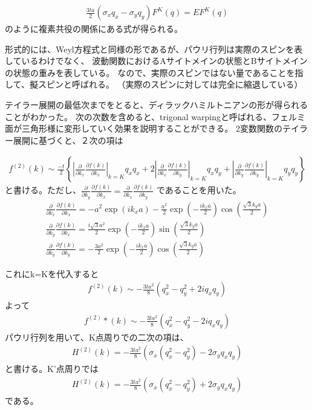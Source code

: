 \documentclass{article}
\begin{document}
\begin{eqnarray}
\frac{3ta}{2} \left( 
\sigma_x q_x-\sigma_y q_y
\right)F^K(q)=E F^K(q)
\end{eqnarray}
のように複素共役の関係にある式が得られる。

形式的には、Weyl方程式と同様の形であるが、パウリ行列は実際のスピンを表しているわけでなく、
波動関数におけるAサイトメインの状態とBサイトメインの状態の重みを表している。
なので、実際のスピンではない量であることを指して、擬スピンと呼ばれる。
（実際のスピンに対しては完全に縮退している）

テイラー展開の最低次までをとると、ディラックハミルトニアンの形が得られることがわかった。
次の次数を含めると、trigonal warpingと呼ばれる、フェルミ面が三角形様に変形していく効果を説明することができる。
2変数関数のテイラー展開に基づくと、２次の項は

\begin{eqnarray}
f^{(2)}(k)\sim \frac{-t}{2} \left \{ \left |\frac{\partial}{\partial k_x}\frac{\partial f(k)}{\partial k_x}\right |_{k=K} q_xq_x 
+2\left |\frac{\partial}{\partial k_x}\frac{\partial f(k)}{\partial k_y}\right |_{k=K} q_xq_y 
+\left |\frac{\partial}{\partial k_y}\frac{\partial f(k)}{\partial k_y}\right |_{k=K} q_yq_y   \right \}
\end{eqnarray}
と書ける。ただし、$\frac{\partial}{\partial k_y}\frac{\partial f(k)}{\partial k_x}=\frac{\partial}{\partial k_x}\frac{\partial f(k)}{\partial k_y}$
であることを用いた。
\begin{eqnarray}
\frac{\partial}{\partial k_x}\frac{\partial f(k)}{\partial k_x}=-a^2 \exp(ik_xa)-\frac{a^2}{2}\exp(-\frac{ik_x a}{2})\cos(\frac{\sqrt{3}k_y a}{2}) \\
\frac{\partial}{\partial k_y}\frac{\partial f(k)}{\partial k_x}=\frac{i\sqrt{3}a^2}{2}\exp(-\frac{ik_x a}{2})\sin(\frac{\sqrt{3}k_y a}{2})\\
\frac{\partial}{\partial k_y}\frac{\partial f(k)}{\partial k_y}=-\frac{3a^2}{2}\exp(-\frac{ik_x a}{2})\cos(\frac{\sqrt{3}k_y a}{2})
\end{eqnarray}

これにk=Kを代入すると
\begin{eqnarray}
f^{(2)}(k)\sim -\frac{3ta^2}{8} (q_x^2-q_y^2 +2iq_xq_y)
\end{eqnarray}
よって
\begin{eqnarray}
f^{(2)}*(k)\sim -\frac{3ta^2}{8} (q_x^2-q_y^2 -2iq_xq_y)
\end{eqnarray}
パウリ行列を用いて、K点周りでの二次の項は、
\begin{eqnarray}
H^{(2)}(k)=-\frac{3ta^2}{8} (\sigma_x(q_x^2-q_y^2) -2\sigma_y q_xq_y)
\end{eqnarray}
と書ける。K'点周りでは
\begin{eqnarray}
H^{(2)}(k)=-\frac{3ta^2}{8} (\sigma_x(q_x^2-q_y^2) +2\sigma_y q_xq_y)
\end{eqnarray}
である。
\end{document}
